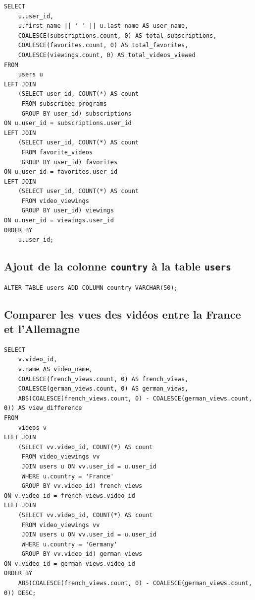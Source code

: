 \documentclass[a4paper,12pt]{article}
\begin{document}
\begin{lstlisting}
SELECT 
    u.user_id,
    u.first_name || ' ' || u.last_name AS user_name,
    COALESCE(subscriptions.count, 0) AS total_subscriptions,
    COALESCE(favorites.count, 0) AS total_favorites,
    COALESCE(viewings.count, 0) AS total_videos_viewed
FROM 
    users u
LEFT JOIN 
    (SELECT user_id, COUNT(*) AS count 
     FROM subscribed_programs 
     GROUP BY user_id) subscriptions 
ON u.user_id = subscriptions.user_id
LEFT JOIN 
    (SELECT user_id, COUNT(*) AS count 
     FROM favorite_videos 
     GROUP BY user_id) favorites 
ON u.user_id = favorites.user_id
LEFT JOIN 
    (SELECT user_id, COUNT(*) AS count 
     FROM video_viewings 
     GROUP BY user_id) viewings 
ON u.user_id = viewings.user_id
ORDER BY 
    u.user_id;
\end{lstlisting}

\subsection{Ajout de la colonne \texttt{country} à la table \texttt{users}}

\begin{lstlisting}
ALTER TABLE users ADD COLUMN country VARCHAR(50);
\end{lstlisting}

\subsection{Comparer les vues des vidéos entre la France et l'Allemagne}

\begin{lstlisting}
SELECT 
    v.video_id,
    v.name AS video_name,
    COALESCE(french_views.count, 0) AS french_views,
    COALESCE(german_views.count, 0) AS german_views,
    ABS(COALESCE(french_views.count, 0) - COALESCE(german_views.count, 0)) AS view_difference
FROM 
    videos v
LEFT JOIN 
    (SELECT vv.video_id, COUNT(*) AS count
     FROM video_viewings vv
     JOIN users u ON vv.user_id = u.user_id
     WHERE u.country = 'France'
     GROUP BY vv.video_id) french_views 
ON v.video_id = french_views.video_id
LEFT JOIN 
    (SELECT vv.video_id, COUNT(*) AS count
     FROM video_viewings vv
     JOIN users u ON vv.user_id = u.user_id
     WHERE u.country = 'Germany'
     GROUP BY vv.video_id) german_views 
ON v.video_id = german_views.video_id
ORDER BY 
    ABS(COALESCE(french_views.count, 0) - COALESCE(german_views.count, 0)) DESC;
\end{lstlisting}
\end{document}
